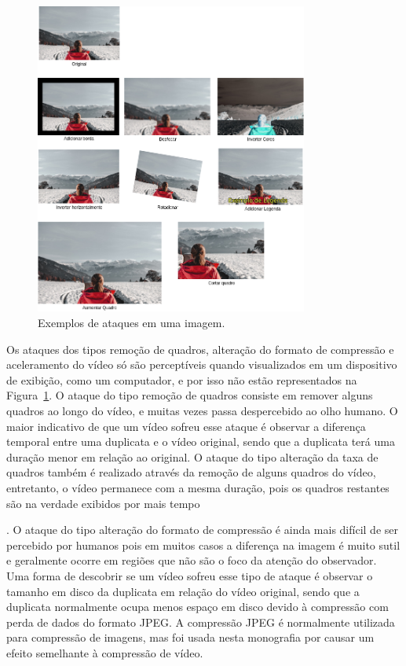     \begin{figure}[h]
        \centering
         \caption{Exemplos de ataques em uma imagem.}
        \includegraphics[width=0.8\textwidth]{dados/figuras/Ataques.png}
       
        
    	\label{fig:ataques}
    \end{figure}

Os ataques dos tipos remoção de quadros, alteração do formato de compressão e aceleramento do vídeo só são perceptíveis quando visualizados em um dispositivo de exibição, como um computador, e por isso não estão representados na Figura~\ref{fig:ataques}. O ataque do tipo remoção de quadros consiste em remover alguns quadros ao longo do vídeo, e muitas vezes passa despercebido ao olho humano. O maior indicativo de que um vídeo sofreu esse ataque é observar a diferença temporal entre uma duplicata e o vídeo original, sendo que a duplicata terá uma duração menor em relação ao original. O ataque do tipo alteração da taxa de quadros também é realizado através da remoção de alguns quadros do vídeo, entretanto, o vídeo permanece com a mesma duração, pois os quadros restantes são na verdade exibidos por mais tempo . O ataque do tipo alteração do formato de compressão é ainda mais difícil de ser percebido por humanos pois em muitos casos a diferença na imagem é muito sutil e geralmente ocorre em regiões que não são o foco da atenção do observador. Uma forma de descobrir se um vídeo sofreu esse tipo de ataque é observar o tamanho em disco da duplicata em relação do vídeo original, sendo que a duplicata normalmente ocupa menos espaço em disco devido à compressão com perda de dados do formato JPEG. A compressão JPEG é normalmente utilizada para compressão de imagens, mas foi usada nesta monografia por causar um efeito semelhante à compressão de vídeo.

